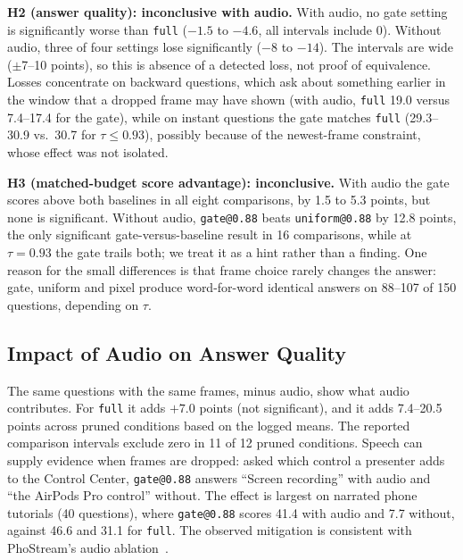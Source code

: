 \documentclass[conference]{IEEEtran}
\newcommand{\cond}[1]{\texttt{#1}}
\begin{document}
\textbf{H2 (answer quality): inconclusive with audio.} With audio, no gate setting is significantly worse than \cond{full} ($-1.5$ to $-4.6$, all intervals include 0). Without audio, three of four settings lose significantly ($-8$ to $-14$). The intervals are wide ($\pm$7--10 points), so this is absence of a detected loss, not proof of equivalence. Losses concentrate on backward questions, which ask about something earlier in the window that a dropped frame may have shown (with audio, \cond{full} 19.0 versus 7.4--17.4 for the gate), while on instant questions the gate matches \cond{full} (29.3--30.9 vs.\ 30.7 for $\tau\le0.93$), possibly because of the newest-frame constraint, whose effect was not isolated.

\textbf{H3 (matched-budget score advantage): inconclusive.} With audio the gate scores above both baselines in all eight comparisons, by 1.5 to 5.3 points, but none is significant. Without audio, \cond{gate@0.88} beats \cond{uniform@0.88} by 12.8 points, the only significant gate-versus-baseline result in 16 comparisons, while at $\tau{=}0.93$ the gate trails both; we treat it as a hint rather than a finding. One reason for the small differences is that frame choice rarely changes the answer: gate, uniform and pixel produce word-for-word identical answers on 88--107 of 150 questions, depending on $\tau$.

\subsection{Impact of Audio on Answer Quality}
The same questions with the same frames, minus audio, show what audio contributes. For \cond{full} it adds $+7.0$ points (not significant), and it adds 7.4--20.5 points across pruned conditions based on the logged means. The reported comparison intervals exclude zero in 11 of 12 pruned conditions. Speech can supply evidence when frames are dropped: asked which control a presenter adds to the Control Center, \cond{gate@0.88} answers ``Screen recording'' with audio and ``the AirPods Pro control'' without. The effect is largest on narrated phone tutorials (40 questions), where \cond{gate@0.88} scores 41.4 with audio and 7.7 without, against 46.6 and 31.1 for \cond{full}. The observed mitigation is consistent with PhoStream's audio ablation~\cite{lu2026phostream}.
\end{document}
